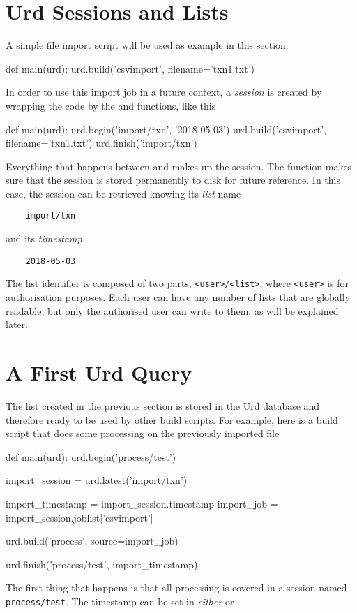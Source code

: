 \section{Urd Sessions and Lists}
A simple file import script will be used as example in this section:
\begin{python}
def main(urd):
    urd.build('csvimport', filename='txn1.txt')
\end{python}
In order to use this import job in a future context,
a \textsl{session} is created by wrapping the code by
the  and  functions, like this
\begin{python}
def main(urd):
    urd.begin('import/txn', '2018-05-03')
    urd.build('csvimport', filename='txn1.txt')
    urd.finish('import/txn')
\end{python}
Everything that happens between  and 
makes up the session.  The  function makes sure that
the session is stored permanently to disk for future reference.  In
this case, the session can be retrieved knowing its \textsl{list} name
\begin{verbatim}
    import/txn
\end{verbatim}
and its \textsl{timestamp}
\begin{verbatim}
    2018-05-03
\end{verbatim}
The list identifier is composed of two parts, \texttt{<user>/<list>}, where
\texttt{<user>} is for authorisation purposes.  Each user can
have any number of lists that are globally readable, but only the
authorised user can write to them, as will be explained later.



\section{A First Urd Query}
The list created in the previous section is stored in the Urd database
and therefore ready to be used by other build scripts.  For example,
here is a build script that does some processing on the previously
imported file
\begin{python}
def main(urd):
    urd.begin('process/test')

    import_session = urd.latest('import/txn')

    import_timestamp = import_session.timestamp
    import_job       = import_session.joblist['csvimport']

    urd.build('process', source=import_job)

    urd.finish('process/test', import_timestamp)
\end{python}
The first thing that happens is that all processing is covered in a
session named \texttt{process/test}.  The timestamp can be set
in \textsl{either}  or .

